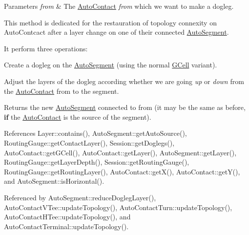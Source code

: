 \begin{DoxyParams}{Parameters}
{\em from} & The \hyperlink{classKatabatic_1_1AutoContact}{Auto\+Contact} {\itshape from} which we want to make a dogleg.\\
\hline
\end{DoxyParams}
This method is dedicated for the restauration of topology connexity on Auto\+Contcact after a layer change on one of their connected \hyperlink{classKatabatic_1_1AutoSegment}{Auto\+Segment}.

It perform three operations\+:
\begin{DoxyEnumerate}
\item Create a dogleg on the \hyperlink{classKatabatic_1_1AutoSegment}{Auto\+Segment} (using the normal \hyperlink{classKatabatic_1_1GCell}{G\+Cell} variant).
\item Adjust the layers of the dogleg according whether we are going {\itshape up} or {\itshape down} from the \hyperlink{classKatabatic_1_1AutoContact}{Auto\+Contact} {\ttfamily from} to the segment.
\item Returns the new \hyperlink{classKatabatic_1_1AutoSegment}{Auto\+Segment} connected to {\ttfamily from} (it may be the same as before, {\bfseries if} the \hyperlink{classKatabatic_1_1AutoContact}{Auto\+Contact} is the source of the segment). 
\end{DoxyEnumerate}

References Layer\+::contains(), Auto\+Segment\+::get\+Auto\+Source(), Routing\+Gauge\+::get\+Contact\+Layer(), Session\+::get\+Doglegs(), Auto\+Contact\+::get\+G\+Cell(), Auto\+Contact\+::get\+Layer(), Auto\+Segment\+::get\+Layer(), Routing\+Gauge\+::get\+Layer\+Depth(), Session\+::get\+Routing\+Gauge(), Routing\+Gauge\+::get\+Routing\+Layer(), Auto\+Contact\+::get\+X(), Auto\+Contact\+::get\+Y(), and Auto\+Segment\+::is\+Horizontal().



Referenced by Auto\+Segment\+::reduce\+Dogleg\+Layer(), Auto\+Contact\+V\+Tee\+::update\+Topology(), Auto\+Contact\+Turn\+::update\+Topology(), Auto\+Contact\+H\+Tee\+::update\+Topology(), and Auto\+Contact\+Terminal\+::update\+Topology().

\mbox{\label{classKatabatic_1_1AutoSegment_a5ca22c853ee33a2b26367eaf29457766}} 
